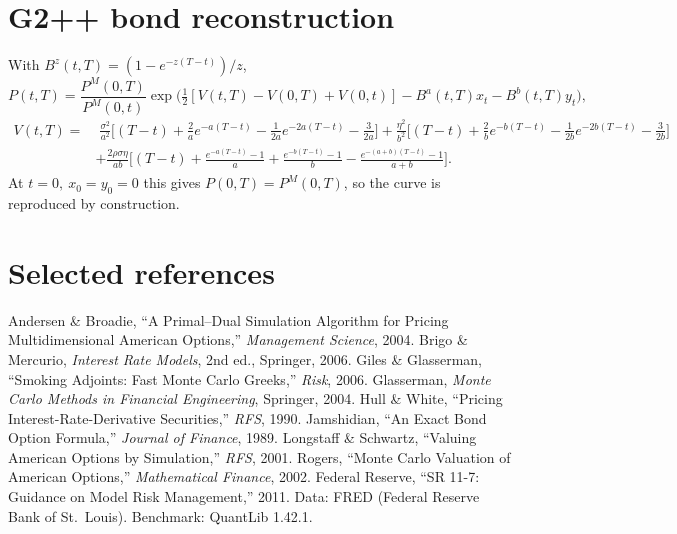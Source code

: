 \documentclass[11pt]{article}
\theoremstyle{plain}
\theoremstyle{definition}
\begin{document}
\section{G2++ bond reconstruction}
\label{app:g2}
With $B^z(t,T)=(1-e^{-z(T-t)})/z$,
\[
P(t,T)=\frac{P^M(0,T)}{P^M(0,t)}\exp\!\Big(\tfrac12[V(t,T)-V(0,T)+V(0,t)]-B^a(t,T)x_t-B^b(t,T)y_t\Big),
\]
\[
\begin{aligned}
V(t,T)=&\;\frac{\sigma^2}{a^2}\big[(T-t)+\tfrac{2}{a}e^{-a(T-t)}-\tfrac{1}{2a}e^{-2a(T-t)}-\tfrac{3}{2a}\big]
+\frac{\eta^2}{b^2}\big[(T-t)+\tfrac{2}{b}e^{-b(T-t)}-\tfrac{1}{2b}e^{-2b(T-t)}-\tfrac{3}{2b}\big]\\
&+\frac{2\rho\sigma\eta}{ab}\big[(T-t)+\tfrac{e^{-a(T-t)}-1}{a}+\tfrac{e^{-b(T-t)}-1}{b}-\tfrac{e^{-(a+b)(T-t)}-1}{a+b}\big].
\end{aligned}
\]
At $t=0,\ x_0=y_0=0$ this gives $P(0,T)=P^M(0,T)$, so the curve is reproduced by construction.

\section*{Selected references}
\small
Andersen \& Broadie, ``A Primal--Dual Simulation Algorithm for Pricing Multidimensional American
Options,'' \emph{Management Science}, 2004. \;
Brigo \& Mercurio, \emph{Interest Rate Models}, 2nd ed., Springer, 2006. \;
Giles \& Glasserman, ``Smoking Adjoints: Fast Monte Carlo Greeks,'' \emph{Risk}, 2006. \;
Glasserman, \emph{Monte Carlo Methods in Financial Engineering}, Springer, 2004. \;
Hull \& White, ``Pricing Interest-Rate-Derivative Securities,'' \emph{RFS}, 1990. \;
Jamshidian, ``An Exact Bond Option Formula,'' \emph{Journal of Finance}, 1989. \;
Longstaff \& Schwartz, ``Valuing American Options by Simulation,'' \emph{RFS}, 2001. \;
Rogers, ``Monte Carlo Valuation of American Options,'' \emph{Mathematical Finance}, 2002. \;
Federal Reserve, ``SR 11-7: Guidance on Model Risk Management,'' 2011. \;
Data: FRED (Federal Reserve Bank of St.\ Louis). Benchmark: QuantLib 1.42.1.
\end{document}
